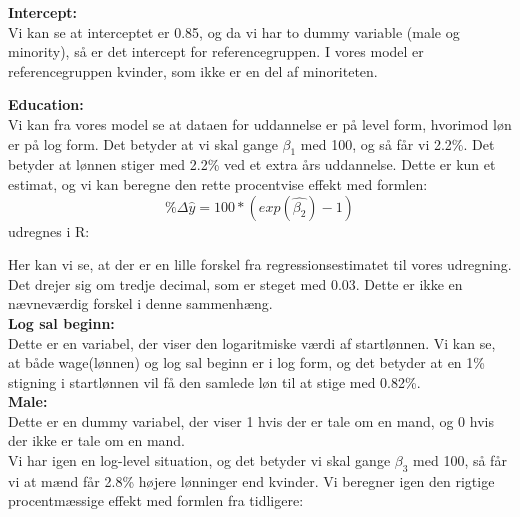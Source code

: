 \documentclass[
  10pt,
]{article}
\newenvironment{Shaded}{\begin{snugshade}}{\end{snugshade}}
\newcommand{\CommentTok}[1]{\textcolor[rgb]{0.56,0.35,0.01}{\textit{#1}}}
\newcommand{\DecValTok}[1]{\textcolor[rgb]{0.00,0.00,0.81}{#1}}
\newcommand{\KeywordTok}[1]{\textcolor[rgb]{0.13,0.29,0.53}{\textbf{#1}}}
\newcommand{\NormalTok}[1]{#1}
\newcommand{\OperatorTok}[1]{\textcolor[rgb]{0.81,0.36,0.00}{\textbf{#1}}}
\begin{document}
\textbf{Intercept:}\\
Vi kan se at interceptet er 0.85, og da vi har to dummy variable (male
og minority), så er det intercept for referencegruppen. I vores model er
referencegruppen kvinder, som ikke er en del af minoriteten.\\
\newpage

\textbf{Education:}\\
Vi kan fra vores model se at dataen for uddannelse er på level form,
hvorimod løn er på log form. Det betyder at vi skal gange \(β_1\) med
100, og så får vi 2.2\%. Det betyder at lønnen stiger med 2.2\% ved et
extra års uddannelse. Dette er kun et estimat, og vi kan beregne den
rette procentvise effekt med formlen: ~
\[\%\Delta\hat{y}=100*(exp(\hat{\beta_2})-1)\] udregnes i R:

\begin{Shaded}
\end{Shaded}

Her kan vi se, at der er en lille forskel fra regressionsestimatet til
vores udregning. Det drejer sig om tredje decimal, som er steget med
0.03. Dette er ikke en nævneværdig forskel i denne sammenhæng.\\
\newline \textbf{Log sal beginn:}\\
Dette er en variabel, der viser den logaritmiske værdi af startlønnen.
Vi kan se, at både wage(lønnen) og log sal beginn er i log form, og det
betyder at en 1\% stigning i startlønnen vil få den samlede løn til at
stige med 0.82\%.\\

\textbf{Male:}\\
Dette er en dummy variabel, der viser 1 hvis der er tale om en mand, og
0 hvis der ikke er tale om en mand.\\
Vi har igen en log-level situation, og det betyder vi skal gange \(β_3\)
med 100, så får vi at mænd får 2.8\% højere lønninger end kvinder. Vi
beregner igen den rigtige procentmæssige effekt med formlen fra
tidligere:

\begin{Shaded}
\end{Shaded}
\end{document}
